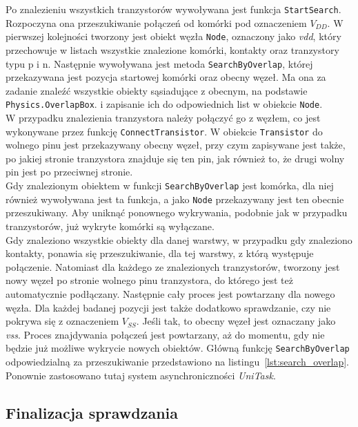 

Po znalezieniu wszystkich tranzystorów wywoływana jest funkcja \texttt{StartSearch}.
Rozpoczyna ona przeszukiwanie połączeń od komórki pod oznaczeniem $V_{DD}$.
W pierwszej kolejności tworzony jest obiekt węzła \texttt{Node}, oznaczony jako \textit{vdd},
który przechowuje w listach wszystkie znalezione komórki,
kontakty oraz tranzystory typu p i n.
Następnie wywoływana jest metoda \texttt{SearchByOverlap},
której przekazywana jest pozycja startowej komórki oraz obecny węzeł.
Ma ona za zadanie znaleźć wszystkie obiekty sąsiadujące z obecnym,
na podstawie \texttt{Physics.OverlapBox}.
i zapisanie ich do odpowiednich list w obiekcie \texttt{Node}.\\
\indent W przypadku znalezienia tranzystora należy połączyć go z węzłem,
co jest wykonywane przez funkcję \texttt{ConnectTransistor}.
W obiekcie \texttt{Transistor} do wolnego pinu jest przekazywany obecny węzeł,
przy czym zapisywane jest także, po jakiej stronie tranzystora znajduje się ten pin,
jak również to, że drugi wolny pin jest po przeciwnej stronie.\\
\indent Gdy znalezionym obiektem w funkcji \texttt{SearchByOverlap} jest komórka,
dla niej również wywoływana jest ta funkcja, a jako \texttt{Node} przekazywany jest ten obecnie przeszukiwany.
Aby uniknąć ponownego wykrywania, podobnie jak w przypadku tranzystorów,
już wykryte komórki są wyłączane.\\
\indent Gdy znaleziono wszystkie obiekty dla danej warstwy,
w przypadku gdy znaleziono kontakty, ponawia się przeszukiwanie, dla tej warstwy, z którą występuje połączenie.
Natomiast dla każdego ze znalezionych tranzystorów,
tworzony jest nowy węzeł po stronie wolnego pinu tranzystora,
do którego jest też automatycznie podłączany.
Następnie cały proces jest powtarzany dla nowego węzła.
Dla każdej badanej pozycji jest także dodatkowo sprawdzanie, czy nie pokrywa się z oznaczeniem $V_{SS}$.
Jeśli tak, to obecny węzeł jest oznaczany jako \textit{vss}.
Proces znajdywania połączeń jest powtarzany, aż do momentu,
gdy nie będzie już możliwe wykrycie nowych obiektów.
Główną funkcję \texttt{SearchByOverlap} odpowiedzialną za przeszukiwanie przedstawiono na listingu~\ref{lst:search_overlap}.
Ponownie zastosowano tutaj system asynchroniczności \textit{UniTask}.



\subsection{Finalizacja sprawdzania}
\label{subsec:finalizacja_sprawdzania}

